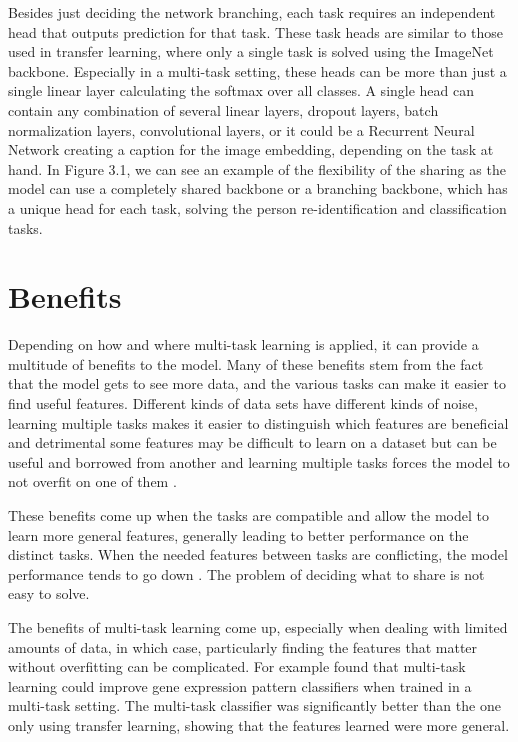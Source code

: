 Besides just deciding the network branching, each task requires an independent head that outputs prediction for that task.
These task heads are similar to those used in transfer learning, where only a single task is solved using the ImageNet backbone.
Especially in a multi-task setting, these heads can be more than just a single linear layer calculating the softmax over all classes.
A single head can contain any combination of several linear layers, dropout layers, batch normalization layers, convolutional layers, or it could be a Recurrent Neural Network creating a caption for the image embedding, depending on the task at hand.
In Figure 3.1, we can see an example of the flexibility of the sharing as the model can use a completely shared backbone or a branching backbone, which has a unique head for each task, solving the person re-identification and classification tasks.

\section{Benefits}
Depending on how and where multi-task learning is applied, it can provide a multitude of benefits to the model.
Many of these benefits stem from the fact that the model gets to see more data, and the various tasks can make it easier to find useful features.
Different kinds of data sets have different kinds of noise, learning multiple tasks makes it easier to distinguish which features are beneficial and detrimental some features may be difficult to learn on a dataset but can be useful and borrowed from another and learning multiple tasks forces the model to not overfit on one of them \citep{ruderOverview}.

These benefits come up when the tasks are compatible and allow the model to learn more general features, generally leading to better performance on the distinct tasks.
When the needed features between tasks are conflicting, the model performance tends to go down \citep{uberNet}.
The problem of deciding what to share is not easy to solve.

The benefits of multi-task learning come up, especially when dealing with limited amounts of data, in which case, particularly finding the features that matter without overfitting can be complicated.
For example \citep{biologicalMultitask} found that multi-task learning could improve gene expression pattern classifiers when trained in a multi-task setting.
The multi-task classifier was significantly better than the one only using transfer learning, showing that the features learned were more general.

